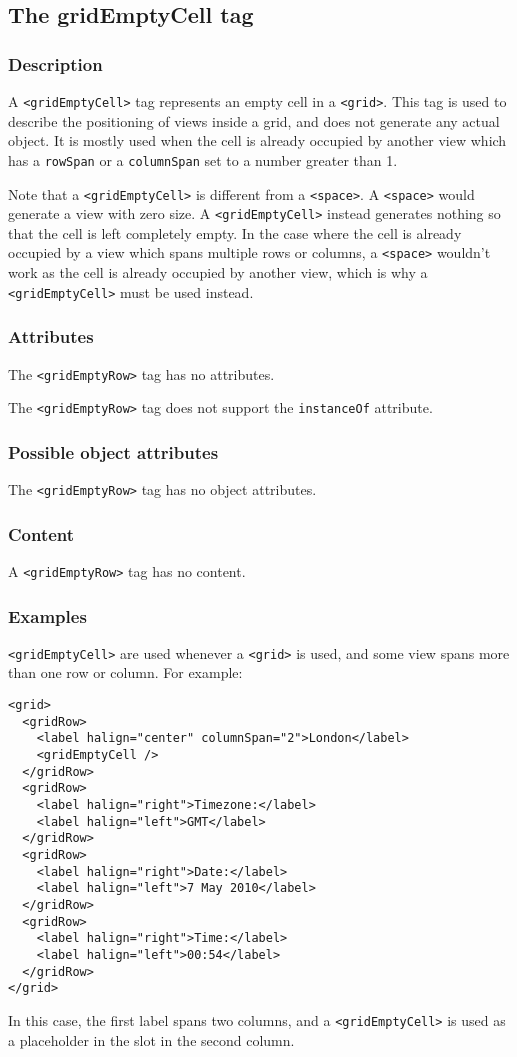\subsection{The gridEmptyCell tag}

\subsubsection{Description}
A \texttt{<gridEmptyCell>} tag represents an empty cell in a
\texttt{<grid>}.  This tag is used to describe the positioning of
views inside a grid, and does not generate any actual object.  It is
mostly used when the cell is already occupied by another view which
has a \texttt{rowSpan} or a \texttt{columnSpan} set to a number
greater than 1.  

Note that a \texttt{<gridEmptyCell>} is different from a
\texttt{<space>}.  A \texttt{<space>} would generate a view with zero
size.  A \texttt{<gridEmptyCell>} instead generates nothing so that
the cell is left completely empty.  In the case where the cell is
already occupied by a view which spans multiple rows or columns, a
\texttt{<space>} wouldn't work as the cell is already occupied by
another view, which is why a \texttt{<gridEmptyCell>} must be used
instead.

\subsubsection{Attributes}
The \texttt{<gridEmptyRow>} tag has no attributes.

The \texttt{<gridEmptyRow>} tag does not support the \texttt{instanceOf}
attribute.

\subsubsection{Possible object attributes}
The \texttt{<gridEmptyRow>} tag has no object attributes.

\subsubsection{Content}
A \texttt{<gridEmptyRow>} tag has no content.

\subsubsection{Examples}
\texttt{<gridEmptyCell>} are used whenever a \texttt{<grid>} is used,
and some view spans more than one row or column.  For example:
\begin{verbatim}
<grid>
  <gridRow>
    <label halign="center" columnSpan="2">London</label>
    <gridEmptyCell />
  </gridRow>
  <gridRow>
    <label halign="right">Timezone:</label>
    <label halign="left">GMT</label>
  </gridRow>
  <gridRow>
    <label halign="right">Date:</label>
    <label halign="left">7 May 2010</label>
  </gridRow>
  <gridRow>
    <label halign="right">Time:</label>
    <label halign="left">00:54</label>
  </gridRow>
</grid>
\end{verbatim}
In this case, the first label spans two columns, and a
\texttt{<gridEmptyCell>} is used as a placeholder in the slot in the
second column.

